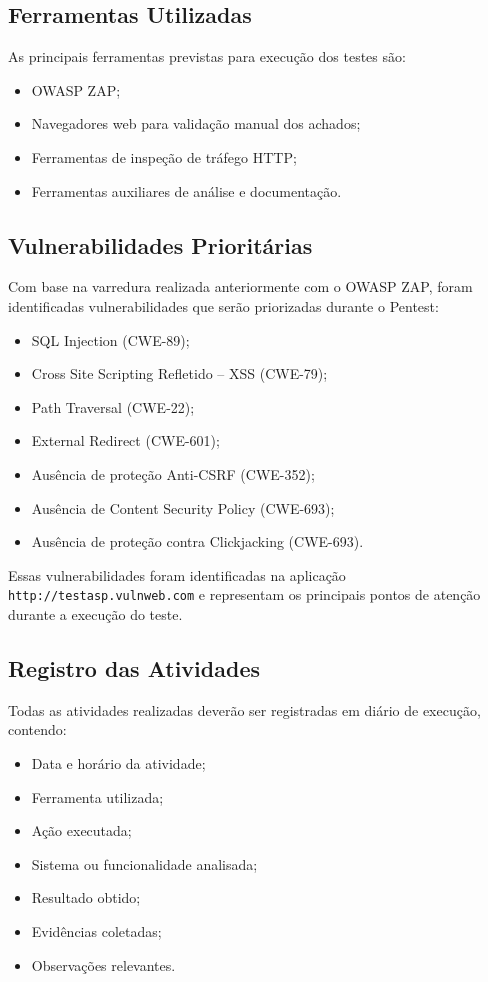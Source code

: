 \subsection{Ferramentas Utilizadas}

As principais ferramentas previstas para execução dos testes são:

\begin{itemize}
\item OWASP ZAP;
\item Navegadores web para validação manual dos achados;
\item Ferramentas de inspeção de tráfego HTTP;
\item Ferramentas auxiliares de análise e documentação.
\end{itemize}

\subsection{Vulnerabilidades Prioritárias}

Com base na varredura realizada anteriormente com o OWASP ZAP, foram
identificadas vulnerabilidades que serão priorizadas durante o Pentest:

\begin{itemize}
\item SQL Injection (CWE-89);
\item Cross Site Scripting Refletido -- XSS (CWE-79);
\item Path Traversal (CWE-22);
\item External Redirect (CWE-601);
\item Ausência de proteção Anti-CSRF (CWE-352);
\item Ausência de Content Security Policy (CWE-693);
\item Ausência de proteção contra Clickjacking (CWE-693).
\end{itemize}

Essas vulnerabilidades foram identificadas na aplicação
\texttt{http://testasp.vulnweb.com} e representam os principais pontos de
atenção durante a execução do teste.

\subsection{Registro das Atividades}

Todas as atividades realizadas deverão ser registradas em diário de execução,
contendo:

\begin{itemize}
\item Data e horário da atividade;
\item Ferramenta utilizada;
\item Ação executada;
\item Sistema ou funcionalidade analisada;
\item Resultado obtido;
\item Evidências coletadas;
\item Observações relevantes.
\end{itemize}

